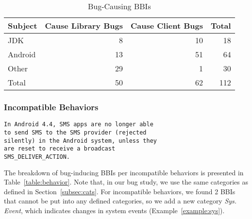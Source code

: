 \begin{table}
	\center 
	\caption{\label{table:basicIncomp} Bug-Causing BBIs}
	
	\begin{tabular}{|l|r|r|r|}
		\hline
		Subject & Cause Library Bugs& Cause Client Bugs & Total\\ 
		\hline
		JDK &        8      &     10   & 18   \\
		Android &         13     &     51   & 64  \\
		Other   &         29     &    1    & 30  \\
		\hline
		Total   & 50             &  62      & 112     \\
		\hline
	\end{tabular}
	\vspace{+0.3cm}		
\end{table}

\subsubsection{Incompatible Behaviors}

\begin{example}
	\begin{verbatim}
In Android 4.4, SMS apps are no longer able 
to send SMS to the SMS provider (rejected 
silently) in the Android system, unless they 
are reset to receive a broadcast 
SMS_DELIVER_ACTION. 	
 \end{verbatim}
	\caption{Bug-408: Be able to configure as a default 
		SMS app in KitKat (\small{from WhisperSystems/TextSecure})} 
	\label{example:sys}
\end{example}

The breakdown of bug-inducing BBIs per incompatible behaviors is presented in Table~\ref{table:behavior}. Note that, in our bug study, we use the same categories as defined in Section~\ref{subsec:cats}. For incompatible behaviors, we found 2 BBIs that cannot be put into any defined categories, so we add a new category \textit{Sys. Event}, which indicates changes in system events (Example~\ref{example:sys}).

